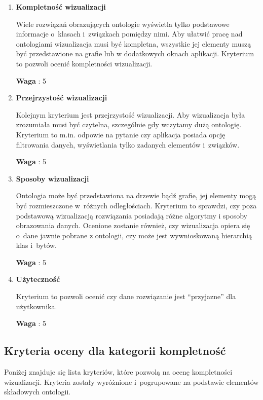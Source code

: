 \begin{enumerate}
 \item{\bf Kompletność wizualizacji} 

  \nopagebreak  
Wiele rozwiązań obrazujących ontologie wyświetla tylko podstawowe informacje o~klasach i~związkach pomiędzy nimi. Aby ułatwić pracę nad ontologiami 
wizualizacja musi być kompletna, wszystkie jej elementy muszą być przedstawione na grafie lub w dodatkowych oknach aplikacji.  Kryterium to pozwoli
ocenić kompletności wizualizacji. 
  \nopagebreak 

{\bf Waga} : 5

 \item{\bf Przejrzystość wizualizacji} 

  \nopagebreak                  
Kolejnym kryterium jest przejrzystość wizualizacji. Aby wizualizacja była zrozumiała musi być czytelna, szczególnie gdy wczytamy dużą ontologię. 
Kryterium to m.in. odpowie na pytanie czy aplikacja posiada opcję filtrowania danych, wyświetlania tylko zadanych elementów i~związków.  
  \nopagebreak 

{\bf Waga} : 5

 \item{\bf Sposoby wizualizacji} 

  \nopagebreak                  
  Ontologia może być przedstawiona na drzewie bądź grafie, jej elementy mogą być rozmieszczone w~różnych odległościach. Kryterium to sprawdzi,
czy poza podstawową wizualizacją rozwiązania posiadają różne algorytmy i sposoby obrazowania danych. Ocenione zostanie również, czy wizualizacja 
opiera się o~dane jawnie pobrane z ontologii, czy może jest wywnioskowaną hierarchią klas i~bytów.   
  \nopagebreak 

{\bf Waga} : 5


 \item{\bf Użyteczność} 

  \nopagebreak                  
  Kryterium to pozwoli ocenić czy dane rozwiązanie jest ``przyjazne'' dla użytkownika. 
  \nopagebreak 

{\bf Waga} : 5

\end{enumerate}




\subsection*{Kryteria oceny dla kategorii kompletność}

Poniżej znajduje się lista kryteriów, które pozwolą na ocenę kompletności wizualizacji. Kryteria zostały wyróżnione i~pogrupowane na podstawie
elementów składowych ontologii. 


